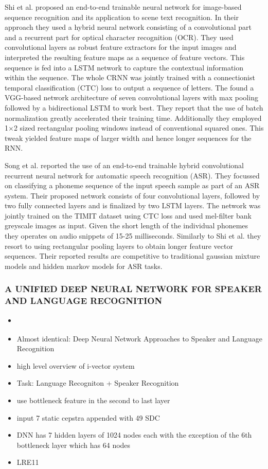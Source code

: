 Shi et al.\cite{shi2016end} proposed an end-to-end trainable neural network for image-based sequence recognition and its application to scene text recognition. In their approach they used a hybrid neural network consisting of a convolutional part and a recurrent part for optical character recognition (OCR). They used convolutional layers as robust feature extractors for the input images and interpreted the resulting feature maps as a sequence of feature vectors. This sequence is fed into a LSTM network to capture the contextual information within the sequence. The whole CRNN was jointly trained with a connectionist temporal classification (CTC) loss \cite{graves2006connectionist} to output a sequence of letters. The found a VGG-based network architecture of seven convolutional layers with max pooling followed by a bidirectional LSTM to work best. They report that the use of batch normalization greatly accelerated their training time. Additionally they employed 1$\times$2 sized rectangular pooling windows instead of conventional squared ones. This tweak yielded feature maps of larger width and hence longer sequences for the RNN.

Song et al.\cite{song2015end} reported the use of an end-to-end trainable hybrid convolutional recurrent neural network for automatic speech recognition (ASR). They focussed on classifying a phoneme sequence of the input speech sample as part of an ASR system. Their proposed network consists of four convolutional layers, followed by two fully connected layers and is finalized by two LSTM layers. The network was jointly trained on the TIMIT dataset using CTC loss and used mel-filter bank greyscale images as input. Given the short length of the individual phonemes they operates on audio snippets of 15-25 milliseconds. Similarly to Shi et al. they resort to using rectangular pooling layers to obtain longer feature vector sequences. Their reported results are competitive to traditional gaussian mixture models and hidden markov models for ASR tasks. 

    \subsubsection{A UNIFIED DEEP NEURAL NETWORK FOR SPEAKER AND LANGUAGE RECOGNITION}
    \begin{itemize}
        \item \cite{richardson2015unified}
        \item Almost identical: Deep Neural Network Approaches to Speaker and Language Recognition \cite{richardson2015deep}
        \item high level overview of i-vector system
        \item Task: Language Recogniton + Speaker Recognition
        \item use bottleneck feature in the second to last layer
        \item input 7 static cepstra appended with 49 SDC
        \item DNN has 7 hidden layers of 1024 nodes each with the exception of the 6th bottleneck layer which has 64 nodes
        \item LRE11
    \end{itemize}
    
